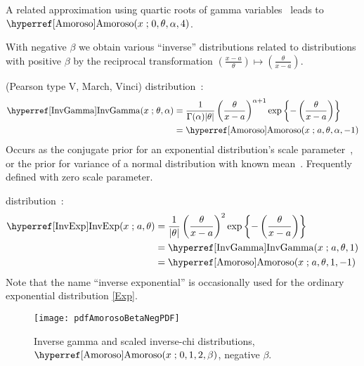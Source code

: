 A related approximation using quartic roots of gamma variables~\cite{Hawkins1986} leads to   $\opr{Amoroso}(x\given  0, \theta, \alpha, 4)$.





With negative $\beta$ we obtain various ``inverse'' distributions related to distributions with positive $\beta$ by the reciprocal transformation $ (\tfrac{x-a}{\theta} ) \mapsto (\tfrac{\theta}{x-a} )$.



 (Pearson type V, March, Vinci) distribution~\cite{Pearson1901, Johnson1994}:
\begin{align}
\label{InvGamma}
\opr{InvGamma}(x \given \theta, \alpha) 
&= \frac{1}{\Gamma(\alpha) |\theta|} \left(\frac{\theta}{x-a}\right)^{\alpha+1} 
 \exp\left\{-\left( \frac{\theta}{x-a}   \right)\right\}  \checked
\\
&=  \opr{Amoroso}(x\given  a, \theta, \alpha, -1) \notag  \checked
\end{align}
Occurs as the conjugate prior for an exponential distribution's scale parameter~\cite{Johnson1994}, or the prior for variance of a  normal distribution with known mean~\cite{Gelman2004}. Frequently defined with zero scale parameter.


 distribution~\cite{Kleiber2003}:
\begin{align}
\label{InvExp}
\opr{InvExp}(x \given a, \theta) 
&= \frac{1}{|\theta|} \left(\frac{\theta}{x-a }\right)^2  \exp\left\{-\left( \frac{\theta}{x-a}   \right)\right\}   \checked \\
&=  \opr{InvGamma}(x\given a,  \theta, 1)  \checked \notag \\
&=  \opr{Amoroso}(x\given  a, \theta, 1, -1) \checked \notag 
\end{align}
Note that the name ``inverse exponential'' is occasionally used for the ordinary exponential distribution \eqref{Exp}.


\begin{figure}[t]
\begin{center}
\texttt{[image: pdfAmorosoBetaNegPDF]}
\end{center}
\caption[Inverse gamma and scaled inverse-chi distributions]{Inverse gamma and scaled inverse-chi distributions, $\opr{Amoroso}(x\given 0,1,2,\beta)$, negative $\beta$.}
\end{figure}




